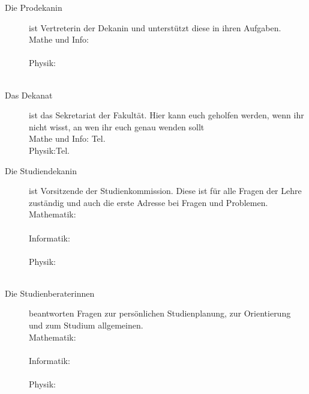 \begin{description}
    \item[Die Prodekanin] ist Vertreterin der Dekanin und unterstützt diese in ihren Aufgaben.\\
    Mathe und Info: \prodekanmathe \\
    \email{\prodekanmatheemail} \\
    Physik: \prodekanphysik  \\
    \prodekanphysikAemail \\
    \email{\prodekanphysikBemail}

    \item[Das Dekanat] ist das Sekretariat der Fakultät. Hier kann euch geholfen werden, wenn ihr nicht wisst, an wen ihr euch genau wenden sollt\\
    Mathe und Info: Tel. \dekanatmathetelefon \\
    Physik:Tel.\dekanatphysiktelefon \\
    \email{\dekanatphysikemail}


    \item[Die Studiendekanin] ist Vorsitzende der Studienkommission. Diese ist für alle Fragen der Lehre zuständig und auch die erste Adresse bei Fragen und Problemen.\\
    Mathematik: \studiendekanmathe \\
    \email{\studiendekanmatheemail} \\
    Informatik: \studiendekaninformatik \\
    \email{\studiendekaninformatikemail} \\
    Physik: \studiendekanphysik \\
    \email{\studiendekanphysikemail} \\

    \item[Die Studienberaterinnen] beantworten Fragen zur persönlichen Studienplanung, zur Orientierung und zum Studium allgemeinen.\\
    Mathematik: \studienberatungmathe \\
    \email{\studienberatungmatheemail} \\
    Informatik: \studienberatunginformatik\\
    \email{\studienberatunginformatikemail} \\
    Physik: \studienberatungphysikersti\\
    \email{\studienberatungphysikemail}\\




\end{description}
